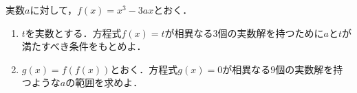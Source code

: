 \documentclass[../../main.tex]{subfiles}
\begin{document}
実数$a$に対して，$f(x)=x^3-3ax$とおく．
\begin{enumerate}
  \item $t$を実数とする．方程式$f(x)=t$が相異なる$3$個の実数解を持つために$a$と$t$が満たすべき条件をもとめよ．
  \item $g(x)=f(f(x))$とおく．方程式$g(x)=0$が相異なる$9$個の実数解を持つような$a$の範囲を求めよ．
\end{enumerate}
\end{document}
